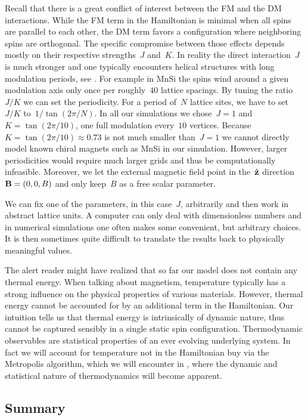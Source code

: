 Recall that there is a great conflict of interest between the FM and
the DM interactions. While the FM term in the Hamiltonian is minimal when all
spins are parallel to each other, the DM term favors a configuration where
neighboring spins are orthogonal. The specific compromise between those effects
depends mostly on their respective strengths~$J$ and~$K$. In reality the direct
interaction~$J$ is much stronger and one typically encounters helical
structures with long modulation periods, see .  For example in MnSi the spins wind
around a given modulation axis only once per roughly~$40$ lattice spacings. By
tuning the ratio~$J/K$ we can set the periodicity. For a period of~$N$ lattice
sites, we have to set~$J/K$ to~$1/\tan(2\pi / N)$. In all our simulations we
chose~$J=1$ and~$K=\tan(2\pi / 10)$, \ie{} one full modulation every~$10$
vertices. Because~$K=\tan(2\pi / 10)\approx 0.73$ is not much smaller than~$J=1$
we cannot directly model known chiral magnets such as MnSi in our simulation.
However, larger periodicities would require much larger grids and thus be
computationally infeasible. Moreover, we let the external magnetic field point
in the~$\hat{\mathbf{z}}$ direction~$\mathbf{B}=(0,0,B)$ and only keep~$B$ as a free scalar
parameter.

We can fix one of the parameters, in this case~$J$, arbitrarily and then work in
abstract lattice units. A computer can only deal with dimensionless numbers and
in numerical simulations one often makes some convenient, but arbitrary choices.
It is then sometimes quite difficult to translate the results back to physically
meaningful values.

The alert reader might have realized that so far our model does not contain any
thermal energy. When talking about magnetism, temperature typically has a strong
influence on the physical properties of various materials. However, thermal
energy cannot be accounted for by an additional term in the Hamiltonian. Our
intuition tells us that thermal energy is intrinsically of dynamic nature, thus
cannot be captured sensibly in a single static spin configuration. Thermodynamic
observables are statistical properties of an ever evolving underlying system. In
fact we will account for temperature not in the Hamiltonian buy via the
Metropolis algorithm, which we will encounter in , where
the dynamic and statistical nature of thermodynamics will become apparent.

\subsection{Summary}

